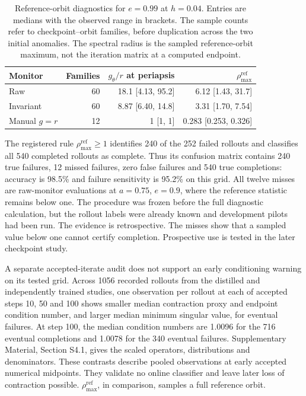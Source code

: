 \documentclass[final,3p,times]{elsarticle}
\begin{document}
\begin{table}[t]
\centering
\caption{Reference-orbit diagnostics for $e=0.99$ at $h=0.04$.
Entries are medians with the observed range in brackets. The sample
counts refer to checkpoint--orbit families, before duplication across
the two initial anomalies. The spectral radius is the sampled
reference-orbit maximum, not the iteration matrix at a computed endpoint.}
\label{tab:periapsis-diagnostic}
\begingroup
\renewcommand{\baselinestretch}{1}\small
\setlength{\tabcolsep}{4pt}
\begin{tabular}{lrrr}
\toprule
Monitor & Families & $g_\theta/r$ at periapsis &
 $\rho_{\max}^{\mathrm{ref}}$ \\
\midrule
Raw & 60 & 18.1 [4.13, 95.2] & 6.12 [1.43, 31.7] \\
Invariant & 60 & 8.87 [6.40, 14.8] & 3.31 [1.70, 7.54] \\
Manual $g=r$ & 12 & 1 [1, 1] & 0.283 [0.253, 0.326] \\
\bottomrule
\end{tabular}
\endgroup
\end{table}

The registered rule $\rho_{\max}^{\mathrm{ref}}\ge1$ identifies 240 of
the 252 failed rollouts and classifies all 540 completed rollouts as
complete. Thus its confusion matrix contains 240 true failures,
12 missed failures, zero false failures and 540 true completions:
accuracy is 98.5\% and failure sensitivity is 95.2\% on this grid.
All twelve misses are raw-monitor evaluations at $a=0.75$, $e=0.9$,
where the reference statistic remains below one. The procedure was
frozen before the full diagnostic calculation, but the rollout labels
were already known and development pilots had been run. The evidence is retrospective. The misses show that a sampled value
below one cannot certify completion. Prospective use is tested in the
later checkpoint study.

A separate accepted-iterate audit does not support an early conditioning
warning on its tested grid. Across 1056 recorded rollouts from the
distilled and independently trained studies, one observation per rollout
at each of accepted steps 10, 50 and 100 shows smaller median contraction
proxy and endpoint condition number, and larger median minimum singular
value, for eventual failures. At step 100, the median condition numbers
are 1.0096 for the 716 eventual completions and 1.0078 for the 340
eventual failures. Supplementary Material, Section S4.1, gives the scaled
operators, distributions and denominators. These contrasts describe pooled observations at
early accepted numerical midpoints. They validate no online classifier
and leave later loss of contraction possible.
$\rho_{\max}^{\mathrm{ref}}$, in comparison, samples a full reference orbit.
\end{document}
